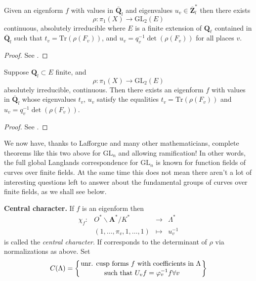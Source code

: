 \begin{theorem}
\label{theorem-drinfeld-make-rho}
Given an eigenform $f$ with values in
$\overline{\mathbf{Q}}_l$ and eigenvalues
$u_v\in \overline{\mathbf{Z}}_l^*$ then there exists
$$
\rho : \pi_1(X)\to \text{GL}_2(E)
$$
continuous, absolutely irreducible where
$E$ is a finite extension of $\mathbf{Q}_\ell$ contained in
$\overline{\mathbf{Q}}_l$ such that
$t_v = \text{Tr}(\rho(F_v))$, and
$u_v = q_v^{-1}\det\left(\rho(F_v)\right)$ for all places $v$.
\end{theorem}

\begin{proof}
See \cite{D0}.
\end{proof}

\begin{theorem}
\label{theorem-drinfeld-make-f}
Suppose $\mathbf{Q}_l \subset E$ finite, and
$$
\rho : \pi_1(X)\to \text{GL}_2(E)
$$
absolutely irreducible, continuous. Then there exists an eigenform $f$ with
values in $\overline{\mathbf{Q}}_l$ whose eigenvalues $t_v$, $u_v$
satisfy the equalities
$t_v = \text{Tr}(\rho(F_v))$ and $u_v = q_v^{-1}\det(\rho(F_v))$.
\end{theorem}

\begin{proof}
See \cite{D1}.
\end{proof}

\begin{remark}
\label{remark-lafforgue}
We now have, thanks to Lafforgue and many other mathematicians,
complete theorems like this two above for $\text{GL}_n$
and allowing ramification!
In other words, the full global Langlands correspondence for $\text{GL}_n$
is known for function fields of curves over finite fields. At the same
time this does not mean there aren't a lot of interesting questions left
to answer about the fundamental groups of curves over finite fields, as
we shall see below.
\end{remark}

\noindent
{\bf Central character.} If $f$ is an eigenform then
$$
\begin{matrix}
\chi_f : &
O^*\backslash \mathbf{A}^*/K^* &
\to &
\Lambda^* \\
&
(1, \ldots, \pi_v, 1, \ldots, 1) &
\mapsto &
u_v^{-1}
\end{matrix}
$$
is called the {\it central character}. If corresponds to the
determinant of $\rho$ via normalizations as above. Set
$$
C(\Lambda) =
\left\{
{\text{unr. cusp forms } f \text{ with coefficients in }\Lambda}
\atop {\text{ such that } U_v f = \varphi_v^{-1}f\forall v}
\right\}
$$

